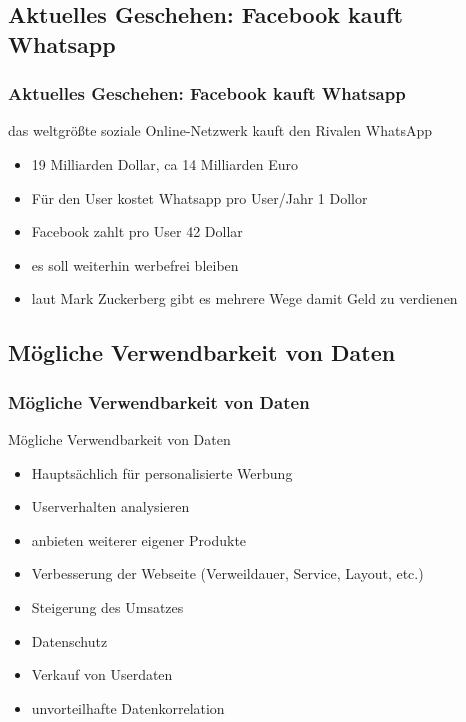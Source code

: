 \documentclass[xcolor=dvipsnames]{beamer}
\begin{document}
\subsection{Aktuelles Geschehen: Facebook kauft Whatsapp}
\begin{frame} %
  \frametitle{Aktuelles Geschehen: Facebook kauft Whatsapp} %
  \begin{block}{das weltgrößte soziale Online-Netzwerk kauft den Rivalen WhatsApp}
	  \begin{itemize}
		\item 19 Milliarden Dollar, ca 14 Milliarden Euro
		\item Für den User kostet Whatsapp pro User/Jahr 1 Dollor
		\item Facebook zahlt pro User 42 Dollar
		\item es soll weiterhin werbefrei bleiben
		\item laut Mark Zuckerberg gibt es mehrere Wege damit Geld zu verdienen
	  \end{itemize}
  \end{block}
\end{frame}


\subsection{Mögliche Verwendbarkeit von Daten}
\begin{frame} %
  \frametitle{Mögliche Verwendbarkeit von Daten} %
  \begin{block}{Mögliche Verwendbarkeit von Daten}
	  \begin{itemize}
	  	\item Hauptsächlich für personalisierte Werbung
		\item Userverhalten analysieren
		\item anbieten weiterer eigener Produkte
		\item Verbesserung der Webseite (Verweildauer, Service, Layout, etc.)
		\item Steigerung des Umsatzes
	  \end{itemize}
  \end{block}
  \begin{alertblock}{}
	  \begin{itemize}
		\item Datenschutz
		\item Verkauf von Userdaten
		\item unvorteilhafte Datenkorrelation
	  \end{itemize}
  \end{alertblock}
\end{frame}
\end{document}
